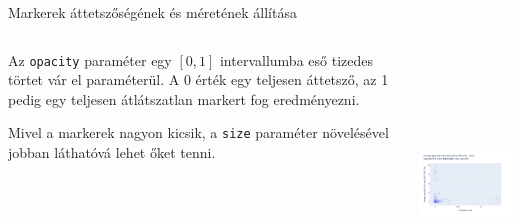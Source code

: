 \documentclass[english, aspectratio=169]{beamer}
\begin{document}
\begin{frame}[fragile]{Markerek áttetszőségének és méretének állítása}
	\begin{columns}
		\begin{column}{.5\textwidth}
			Az \texttt{opacity} paraméter egy $\left[0,1\right]$ intervallumba eső tizedes törtet vár el paraméterül. A 0 érték egy teljesen áttetsző, az 1 pedig egy teljesen átlátszatlan markert fog eredményezni.\par\medskip
			Mivel a markerek nagyon kicsik, a \texttt{size} paraméter növelésével jobban láthatóvá lehet őket tenni.
		\end{column}
		\begin{column}{.5\textwidth}
			\begin{center}
				\includegraphics[width=7cm, height=7cm, keepaspectratio]{images/scatter_14.png}
			\end{center}
		\end{column}
	\end{columns}
\end{frame}
\end{document}
